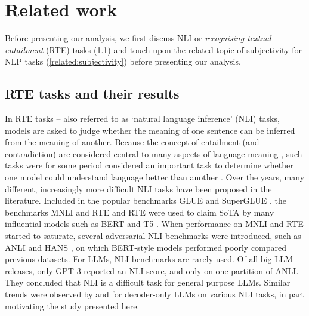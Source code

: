 \section{Related work}

Before presenting our analysis, we first discuss NLI or \emph{recognising textual entailment} (RTE) tasks (\cref{related:nli}) and touch upon the related topic of subjectivity for NLP tasks (\cref{related:subjectivity}) before presenting our analysis.

\subsection{RTE tasks and their results}
\label{related:nli}

In RTE tasks -- also referred to as `natural language inference' (NLI) tasks, models are asked to judge whether the meaning of one sentence can be inferred from the meaning of another.
Because the concept of entailment (and contradiction) are considered central to many aspects of language meaning \citep[e.g.][]{bowman-etal-2015-large}, such tasks were for some period considered an important task to determine whether one model could understand language better than another \citep{poliak-2020-survey}.
Over the years, many different, increasingly more difficult NLI tasks have been proposed in the literature.
Included in the popular benchmarks GLUE \citep{wang2019glue} and SuperGLUE \citep{wang2019superglue}, the benchmarks MNLI \citep{williams-etal-2018-broad} and RTE \citep{dagan2005pascal} and RTE were used to claim SoTA by many influential models such as BERT \citep{devlin2019bert} and T5 \citep{raffel2023t5}.
When performance on MNLI and RTE started to saturate, several adversarial NLI benchmarks were introduced, such as ANLI \citep{raffel2023t5} and HANS \citep{mccoy-etal-2019-right}, on which BERT-style models performed poorly compared previous datasets.
For LLMs, NLI benchmarks are rarely used.
Of all big LLM releases, only GPT-3 \citep{brown2020language} reported an NLI score, and only on one partition of ANLI.
They concluded that NLI is a difficult task for general purpose LLMs.
Similar trends were observed by \citet{ohmer2024form} and \citet{weber-etal-2023-mind} for decoder-only LLMs on various NLI tasks, in part motivating the study presented here.

